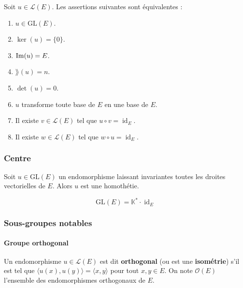   \begin{theorem}
    Soit $u \in \mathcal{L}(E)$. Les assertions suivantes sont équivalentes :
    \begin{enumerate}[label=(\roman*)]
      \item $u \in \mathrm{GL}(E)$.
      \item $\ker(u) = \{ 0 \}$.
      \item $\mathrm{Im}(u) = E$.
      \item $\rang(u) = n$.
      \item $\det(u) = 0$.
      \item $u$ transforme toute base de $E$ en une base de $E$.
      \item Il existe $v \in \mathcal{L}(E)$ tel que $u \circ v = \operatorname{id}_E$.
      \item Il existe $w \in \mathcal{L}(E)$ tel que $w \circ u = \operatorname{id}_E$.
    \end{enumerate}
  \end{theorem}

  \subsubsection{Centre}


  \begin{proposition}
    Soit $u \in \mathrm{GL}(E)$ un endomorphisme laissant invariantes toutes les droites vectorielles de $E$. Alors $u$ est une homothétie.
  \end{proposition}

  \begin{theorem}
    \[ \mathrm{GL}(E) = \mathbb{K}^* \cdot \operatorname{id}_E \]
  \end{theorem}

  \subsubsection{Sous-groupes notables}

  \paragraph{Groupe orthogonal}


  \begin{definition}
    Un endomorphisme $u \in \mathcal{L}(E)$ est dit \textbf{orthogonal} (ou est une \textbf{isométrie}) s'il est tel que $\langle u(x), u(y) \rangle = \langle x, y \rangle$ pour tout $x, y \in E$. On note $\mathcal{O}(E)$ l'ensemble des endomorphismes orthogonaux de $E$.
  \end{definition}

